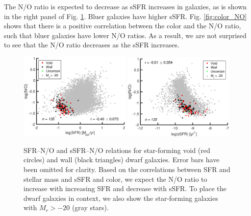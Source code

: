 The N/O ratio is expected to decrease as sSFR increases in galaxies, as is shown 
in the right panel of Fig. \ref{fig:SFR_NO}.  Bluer galaxies have higher sSFR.  
Fig. \ref{fig:color_NO} shows that there is a positive correlation between the 
color and the N/O ratio, such that bluer galaxies have lower N/O ratios.  As a 
result, we are not surprised to see that the N/O ratio decreases as the sSFR 
increases.

\begin{figure}
    \includegraphics[width=0.49\textwidth]{Images/Paper2/SFR_NO_1sig_I06_dwarf_0-20_SF_t3}
    \includegraphics[width=0.49\textwidth]{Images/Paper2/sSFR_NO_1sig_I06_dwarf_0-20_SF_t3}
    \caption[(s)SFR versus N/O for 135 dwarf galaxy sample]{SFR--N/O and 
    sSFR--N/O relations for star-forming void (red circles) and wall (black 
    triangles) dwarf galaxies.  Error bars have been omitted for clarity.  Based 
    on the correlations between SFR and stellar mass and sSFR and color, we 
    expect the N/O ratio to increase with increasing SFR and decrease with sSFR.  
    To place the dwarf galaxies in context, we also show the star-forming 
    galaxies with $M_r > -20$ (gray stars).}
    \label{fig:SFR_NO}
\end{figure}



